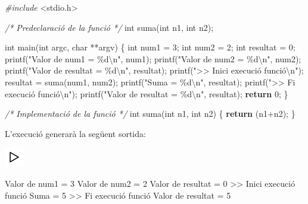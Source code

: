 \documentclass[
]{book}
\newenvironment{Shaded}{\begin{snugshade}}{\end{snugshade}}
\newcommand{\CommentTok}[1]{\textcolor[rgb]{0.56,0.35,0.01}{\textit{#1}}}
\newcommand{\ControlFlowTok}[1]{\textcolor[rgb]{0.13,0.29,0.53}{\textbf{#1}}}
\newcommand{\DataTypeTok}[1]{\textcolor[rgb]{0.13,0.29,0.53}{#1}}
\newcommand{\DecValTok}[1]{\textcolor[rgb]{0.00,0.00,0.81}{#1}}
\newcommand{\ImportTok}[1]{#1}
\newcommand{\NormalTok}[1]{#1}
\newcommand{\PreprocessorTok}[1]{\textcolor[rgb]{0.56,0.35,0.01}{\textit{#1}}}
\newcommand{\SpecialCharTok}[1]{\textcolor[rgb]{0.00,0.00,0.00}{#1}}
\newcommand{\StringTok}[1]{\textcolor[rgb]{0.31,0.60,0.02}{#1}}
\begin{document}
\begin{Shaded}
\begin{Highlighting}[]
\PreprocessorTok{\#include }\ImportTok{\textless{}stdio.h\textgreater{}}

\CommentTok{/* Predeclaració de la funció */}
\DataTypeTok{int}\NormalTok{ suma(}\DataTypeTok{int}\NormalTok{ n1, }\DataTypeTok{int}\NormalTok{ n2);}

\DataTypeTok{int}\NormalTok{ main(}\DataTypeTok{int}\NormalTok{ argc, }\DataTypeTok{char}\NormalTok{ **argv) \{}
    \DataTypeTok{int}\NormalTok{ num1 = }\DecValTok{3}\NormalTok{;}
    \DataTypeTok{int}\NormalTok{ num2 = }\DecValTok{2}\NormalTok{;}
    \DataTypeTok{int}\NormalTok{ resultat = }\DecValTok{0}\NormalTok{;}
\NormalTok{    printf(}\StringTok{"Valor de num1 = \%d}\SpecialCharTok{\textbackslash{}n}\StringTok{"}\NormalTok{, num1);}
\NormalTok{    printf(}\StringTok{"Valor de num2 = \%d}\SpecialCharTok{\textbackslash{}n}\StringTok{"}\NormalTok{, num2);}
\NormalTok{    printf(}\StringTok{"Valor de resultat = \%d}\SpecialCharTok{\textbackslash{}n}\StringTok{"}\NormalTok{, resultat);}
\NormalTok{    printf(}\StringTok{"\textgreater{}\textgreater{} Inici execució funció}\SpecialCharTok{\textbackslash{}n}\StringTok{"}\NormalTok{);}
\NormalTok{    resultat = suma(num1, num2);}
\NormalTok{    printf(}\StringTok{"Suma = \%d}\SpecialCharTok{\textbackslash{}n}\StringTok{"}\NormalTok{, resultat);}
\NormalTok{    printf(}\StringTok{"\textgreater{}\textgreater{} Fi execució funció}\SpecialCharTok{\textbackslash{}n}\StringTok{"}\NormalTok{);}
\NormalTok{    printf(}\StringTok{"Valor de resultat = \%d}\SpecialCharTok{\textbackslash{}n}\StringTok{"}\NormalTok{, resultat);}
    \ControlFlowTok{return} \DecValTok{0}\NormalTok{;}
\NormalTok{\}}

\CommentTok{/* Implementació de la funció */}
\DataTypeTok{int}\NormalTok{ suma(}\DataTypeTok{int}\NormalTok{ n1, }\DataTypeTok{int}\NormalTok{ n2) \{}
    \ControlFlowTok{return}\NormalTok{ (n1+n2);}
\NormalTok{\}}
\end{Highlighting}
\end{Shaded}

L'execució generarà la següent sortida:

\includegraphics{./img/play.png}

\begin{Shaded}
\begin{Highlighting}[]
\NormalTok{Valor de num1 = }\DecValTok{3}
\NormalTok{Valor de num2 = }\DecValTok{2}
\NormalTok{Valor de resultat = }\DecValTok{0}
\NormalTok{\textgreater{}\textgreater{} Inici execució funció}
\NormalTok{Suma = }\DecValTok{5}
\NormalTok{\textgreater{}\textgreater{} Fi execució funció}
\NormalTok{Valor de resultat = }\DecValTok{5}
\end{Highlighting}
\end{Shaded}
\end{document}
